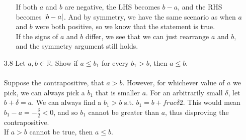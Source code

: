 \begin{itemize}
\begin{itemize}
        If both $a$ and $b$ are negative, the LHS becomes $b - a$, and the RHS becomes $\left\vert b - a \right\vert$. And by symmetry, we have the same scenario as when $a$ and $b$ were both positive, so we know that the statement is true.\\

        If the signs of $a$ and $b$ differ, we see that we can just rearrange $a$ and $b$, and the symmetry argument still holds.\\

    \end{itemize}
  \item[3.8]
    Let $a,b \in \mathds{R}$. Show if $a \leq b_1$ for every $b_1 > b$, then $a \leq b$.\\\\

    Suppose the contrapositive, that $a > b$. However, for whichever value of $a$ we pick, we can always pick a $b_1$ that is smaller $a$. For an arbitrarily small $\delta$, let $b + \delta = a$. We can always find a $b_1 > b$ s.t. $b_1 = b + frac{\delta}{2}$. This would mean $b_1 - a = -\frac{\delta}{2} < 0$, and so $b_1$ cannot be greater than $a$, thus disproving the contrapositive.\\

    If $a > b$ cannot be true, then $a \leq b$.
\end{itemize}


